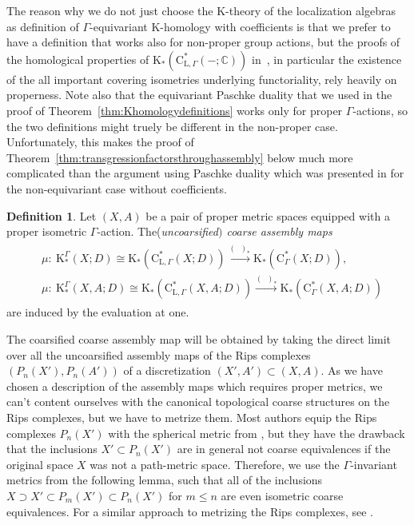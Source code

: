 \documentclass[pdftex]{sigma}
\numberwithin{equation}{section}
\theoremstyle{definition}
\newtheorem{defn}[thm]{Definition}
\newcommand{\C}{\mathbb{C}}
\newcommand{\ev}[1]{\mathop{\textrm{ev}_{#1}}}
\newcommand{\K}{\mathrm{K}}
\newcommand{\Roe}{\mathrm{C}^*}
\newcommand{\Loc}{\mathrm{C}^*_{\mathrm{L},\Gamma}}
\newcommand{\blank}{-}
\begin{document}
The reason why we do not just choose the $\K$-theory of the localization algebras as definition of $\Gamma$-equivariant $\K$-homology with coefficients is that we prefer to have a definition that works also for non-proper group actions, but the proofs of the homological properties of $\K_*(\Loc(\blank;\C))$ in~\cite{WillettYuHigherIndexTheory}, in particular the existence of the all important covering isometries underlying functoriality, rely heavily on properness.
Note also that the equivariant Paschke duality that we used in the proof of Theorem~\ref{thm:Khomologydefinitions} works only for proper $\Gamma$-actions, so the two definitions might truely be different in the non-proper case.
Unfortunately, this makes the proof of Theorem~\ref{thm:transgressionfactorsthroughassembly} below much more complicated than the argument using Paschke duality which was presented in \cite[Remark~12.3.8]{HigRoe} for the non-equivariant case without coefficients.


\begin{defn}
Let $(X,A)$ be a pair of proper metric spaces equipped with a proper isometric $\Gamma$-action.
The(\emph{uncoarsified$)$ coarse assembly maps}
\begin{gather*}
\begin{split}
&\mu\colon\ \K^\Gamma_*(X;D)\cong \K_*(\Loc(X;D))\xrightarrow{(\ev1)_*}\K_*(\Roe_\Gamma(X;D)),
\\
&\mu\colon\ \K^\Gamma_*(X,A;D)\cong \K_*(\Loc(X,A;D))\xrightarrow{(\ev1)_*}\K_*(\Roe_\Gamma(X,A;D))
\end{split}
\end{gather*}
are induced by the evaluation at one.
\end{defn}

The coarsified coarse assembly map will be obtained by taking the direct limit over all the uncoarsified assembly maps of the Rips complexes $(P_n(X'),P_n(A'))$ of a discretization $(X',A')\subset (X,A)$.
As we have chosen a description of the assembly maps which requires proper metrics, we can't content ourselves with the canonical topological coarse structures on the Rips complexes, but we have to metrize them.
Most authors equip the Rips complexes $P_n(X')$ with the spherical metric from \cite{Roe_Hyperbolic}, but they have the drawback that the inclusions $X'\subset P_n(X')$ are in general not coarse equivalences if the original space $X$ was not a path-metric space.
Therefore, we use the $\Gamma$-invariant metrics from the following lemma, such that all of the inclusions $X\supset X'\subset P_m(X')\subset P_n(X')$ for $m\leq n$ are even isometric coarse equivalences.
For a similar approach to metrizing the Rips complexes, see \cite[Section~7.2]{WillettYuHigherIndexTheory}.
\end{document}
